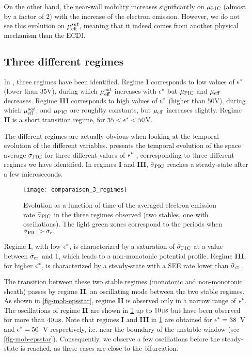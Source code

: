  On the other hand, the near-wall mobility increases significantly on $\mu_{\mathrm{PIC}}$ (almost by a factor of 2) with the increase of the electron emission.
  However, we do not see this evolution on $\mu_{\mathrm{eff}}^{sat}$, meaning that it indeed comes from another physical mechanism than the \ac{ECDI}.
  
  
  \subsection{Three different regimes}
  \label{subsec-regimes}

  In , three regimes have been identified.
  Regime {\bf I} corresponds to low values of $\epsilon^{*}$ (lower than 35V), during which $\mu_{\mathrm{eff}}^{sat}$ increases with $\epsilon^{*}$ but $\mu_{\mathrm{PIC}}$ and $\mu_{\mathrm{eff}}$ decreases.
  Regime {\bf III} corresponds to high values of $\epsilon^{*}$ (higher than 50V), during which $\mu_{\mathrm{eff}}^{sat}$, and  $\mu_{\mathrm{PIC}}$ are roughlty constants, but $\mu_{\mathrm{eff}}$ increases slightly.
  Regime {\bf II} is a short transition regime, for $35 < \epsilon^{*} < 50$V.
  
  The different regimes are actually obvious when looking at the temporal evolution of the different variables.
    presents the temporal evolution of the space average $ \bar{\sigma }_{\rm PIC}$ for three different
  values of $\epsilon^{*}$ , corresponding to three different regimes we have identified.
  In regimes {\bf I} and {\bf III}, $ \bar{\sigma }_{\rm PIC}$ reaches a steady-state after a few microseconds.

  \begin{figure}[hbtp]
    \centering
    \texttt{[image: comparaison\_3\_regimes]}
    \caption{Evolution as a function of time of the averaged electron emission rate $ \bar{\sigma }_{\rm PIC}$ in the three regimes observed (two stables, one with oscillations). The light green zones correspond to the periods when $ \bar{\sigma }_{\rm PIC} >  \bar{\sigma }_{\rm cr}$}
    \label{fig-threeregimes}
  \end{figure}
  

  Regime {\bf I}, with low $\epsilon^{*}$, is characterized by a saturation of $ \bar{\sigma }_{\rm PIC}$ at a value between $ \bar{\sigma }_{\rm cr}$ and 1, which leads to a non-monotonic potential profile.
  Regime {\bf III}, for higher $\epsilon^{*}$, is characterized by a steady-state with a SEE rate lower than $ \bar{\sigma }_{\rm cr}$.

  The transition between these two stable regimes (monotonic and non-monotonic sheath) passes by regime {\bf II}, an oscillating mode between the two stable regimes.
 As shown in \cref{fig-mob-epsstar}, regime {\bf II} is observed only in a narrow range of $\epsilon^{*}$.
 The oscillations of regime {\bf II} are shown in \cref{fig-threeregimes} up to $10\mathrm{\upmu s}$ but have been observed for more than $40\mathrm{\upmu s}$.
 Note that regimes {\bf I} and {\bf III} in \cref{fig-threeregimes} are obtained for $\epsilon^{*} = 38$~V and $\epsilon^{*} = 50$~V respectively, i.e. near the boundary of the unstable window (see \cref{fig-mob-epsstar}).
 Consequently, we observe a few oscillations before the steady-state is reached, as these cases are close to the bifurcation.
   
